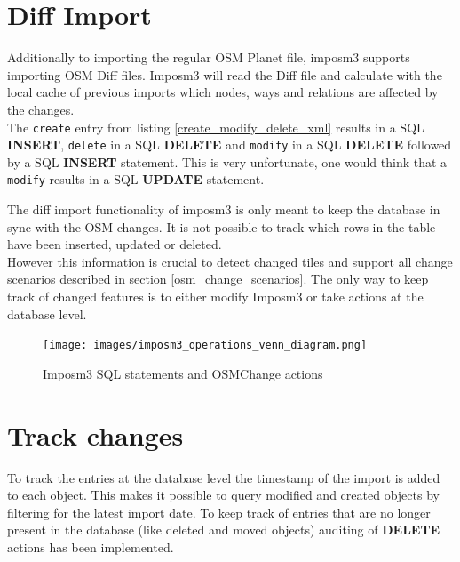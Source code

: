 \section{Diff Import}\label{diff_import}

Additionally to importing the regular OSM Planet file, imposm3 supports importing OSM Diff files. Imposm3 will read the Diff file and calculate with the local cache of previous imports which nodes, ways and relations are affected by the changes.\\
The \texttt{create} entry from listing \autoref{create_modify_delete_xml} results in a
SQL \textbf{INSERT}, \texttt{delete} in a SQL \textbf{DELETE} and \texttt{modify} in a SQL \textbf{DELETE} followed by a SQL \textbf{INSERT} statement. This is very unfortunate, one would think that a \texttt{modify} results in a SQL \textbf{UPDATE} statement. 

\noindent\begin{minipage}[t]{0.48\linewidth}
    \vspace{0pt}
    The diff import functionality of imposm3 is only meant to keep the database in sync with the OSM changes. It is not possible to track which rows in the table have been inserted, updated or deleted.\\
    However this information is crucial to detect changed tiles and support all change scenarios described in section \autoref{osm_change_scenarios}.
    The only way to keep track of changed features is to either modify Imposm3 or take actions at the database level.
\end{minipage}
\hfill
\begin{minipage}[t]{0.48\linewidth}
    \vspace{-20pt}
    \begin{figure}[H]
      \centering
      \texttt{[image: images/imposm3\_operations\_venn\_diagram.png]}
      \caption{Imposm3 SQL statements and OSMChange actions}
    \end{figure}
\end{minipage}


\section{Track changes}

To track the entries at the database level the timestamp of the import is added to each object. This makes it possible to query modified and created objects by filtering for the latest import date. To keep track of entries that are no longer present in the database (like deleted and moved objects) auditing of \textbf{DELETE} actions has been implemented.

